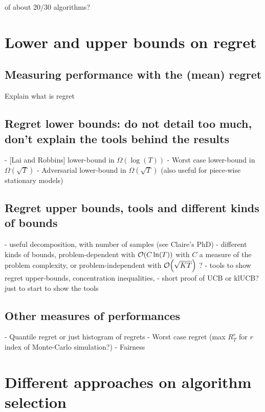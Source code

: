 of about 20/30 algorithms?


\section{Lower and upper bounds on regret}
\label{sec:2:lowerUpperBoundsRegret}


\subsection{Measuring performance with the (mean) regret}
Explain what is regret


\subsection{Regret lower bounds: do not detail too much, don't explain the tools behind the results}

- [Lai and Robbins] lower-bound in $\Omega(\log(T))$
- Worst case lower-bound in $\Omega(\sqrt{T})$
- Adversarial lower-bound in $\Omega(\sqrt{T})$ (also useful for piece-wise stationary models)


\subsection{Regret upper bounds, tools and different kinds of bounds}

- useful decomposition, with number of samples (see Claire's PhD)
- different kinds of bounds, problem-dependent with $\mathop{}\mathopen{}\mathcal{O}\mathopen{}\left(C \ln(T)\right)$ with $C$ a measure of the problem complexity, or problem-independent with $\mathop{}\mathopen{}\mathcal{O}\mathopen{}\left(\sqrt{KT}\right)$ ?
- tools to show regret upper-bounds, concentration inequalities,
- short proof of UCB or klUCB? just to start to show the tools


\subsection{Other measures of performances}

- Quantile regret or just histogram of regrets
- Worst case regret (max $R_T^{r}$ for $r$ index of Monte-Carlo simulation?)
- Fairness


\section{Different approaches on algorithm selection}
\label{sec:2:chooseYourPreferredBanditAlgorithm}

